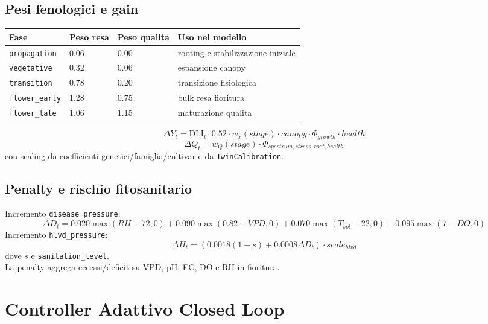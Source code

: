 ﻿\documentclass[11pt,a4paper]{report}
\begin{document}
\section{Pesi fenologici e gain}
\begin{longtable}{@{}p{3.2cm}p{2.0cm}p{2.0cm}p{6.8cm}@{}}
\toprule
Fase & Peso resa & Peso qualita & Uso nel modello \\ \midrule
\texttt{propagation} & 0.06 & 0.00 & rooting e stabilizzazione iniziale \\
\texttt{vegetative} & 0.32 & 0.06 & espansione canopy \\
\texttt{transition} & 0.78 & 0.20 & transizione fisiologica \\
\texttt{flower\_early} & 1.28 & 0.75 & bulk resa fioritura \\
\texttt{flower\_late} & 1.06 & 1.15 & maturazione qualita \\
\bottomrule
\end{longtable}

\begin{equation}
\Delta Y_t = \mathrm{DLI}_t \cdot 0.52 \cdot w_Y(stage) \cdot canopy \cdot \Phi_{growth} \cdot health
\end{equation}
\begin{equation}
\Delta Q_t = w_Q(stage)\cdot \Phi_{spectrum,stress,root,health}
\end{equation}
con scaling da coefficienti genetici/famiglia/cultivar e da \texttt{TwinCalibration}.

\section{Penalty e rischio fitosanitario}
Incremento \texttt{disease\_pressure}:
\begin{equation}
\Delta D_t = 0.020\max(RH-72,0)+0.090\max(0.82-VPD,0)+0.070\max(T_{sol}-22,0)+0.095\max(7-DO,0)
\end{equation}
Incremento \texttt{hlvd\_pressure}:
\begin{equation}
\Delta H_t = \left(0.0018(1-s)+0.0008\Delta D_t\right)\cdot scale_{hlvd}
\end{equation}
dove \(s\) e \texttt{sanitation\_level}.\\
La penalty aggrega eccessi/deficit su VPD, pH, EC, DO e RH in fioritura.

\newpage
\chapter{Controller Adattivo Closed Loop}
\end{document}
